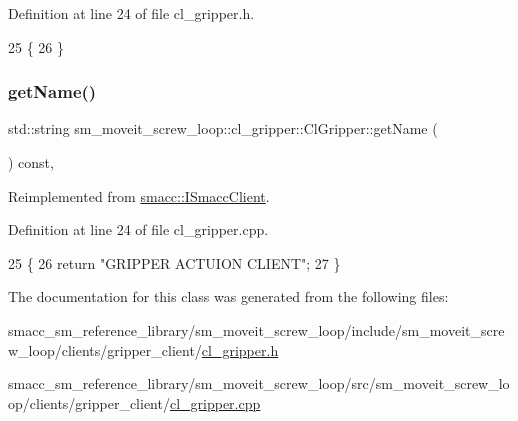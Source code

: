 Definition at line 24 of file cl\+\_\+gripper.\+h.


\begin{DoxyCode}
25   \{
26   \}
\end{DoxyCode}
\mbox{\label{classsm__moveit__screw__loop_1_1cl__gripper_1_1ClGripper_a72e4e06d572de908077cf2fde2c92a5c}} 
\subsubsection{\texorpdfstring{get\+Name()}{getName()}}
{\footnotesize\ttfamily std\+::string sm\+\_\+moveit\+\_\+screw\+\_\+loop\+::cl\+\_\+gripper\+::\+Cl\+Gripper\+::get\+Name (\begin{DoxyParamCaption}{ }\end{DoxyParamCaption}) const\hspace{0.3cm}{\ttfamily [override]}, {\ttfamily [virtual]}}



Reimplemented from \hyperlink{classsmacc_1_1ISmaccClient_a8c3ce19f182e71909c5dc6263d25be69}{smacc\+::\+I\+Smacc\+Client}.



Definition at line 24 of file cl\+\_\+gripper.\+cpp.


\begin{DoxyCode}
25 \{
26     \textcolor{keywordflow}{return} \textcolor{stringliteral}{"GRIPPER ACTUION CLIENT"};
27 \}
\end{DoxyCode}


The documentation for this class was generated from the following files\+:\begin{DoxyCompactItemize}
\item 
smacc\+\_\+sm\+\_\+reference\+\_\+library/sm\+\_\+moveit\+\_\+screw\+\_\+loop/include/sm\+\_\+moveit\+\_\+screw\+\_\+loop/clients/gripper\+\_\+client/\hyperlink{sm__moveit__screw__loop_2include_2sm__moveit__screw__loop_2clients_2gripper__client_2cl__gripper_8h}{cl\+\_\+gripper.\+h}\item 
smacc\+\_\+sm\+\_\+reference\+\_\+library/sm\+\_\+moveit\+\_\+screw\+\_\+loop/src/sm\+\_\+moveit\+\_\+screw\+\_\+loop/clients/gripper\+\_\+client/\hyperlink{sm__moveit__screw__loop_2src_2sm__moveit__screw__loop_2clients_2gripper__client_2cl__gripper_8cpp}{cl\+\_\+gripper.\+cpp}\end{DoxyCompactItemize}
